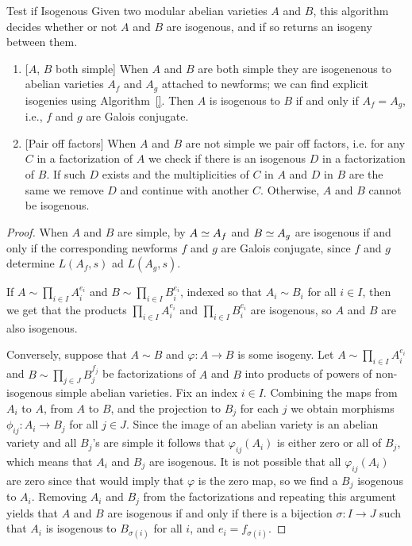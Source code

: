 \documentclass{article}
\begin{document}
\begin{algorithm}{Test if Isogenous}
    Given two modular abelian varieties $A$ and $B$, this
    algorithm decides whether or not $A$ and $B$ are isogenous, and if
    so returns an isogeny between them.

\begin{enumerate}
\item{} [$A$, $B$ both simple] When $A$ and $B$ are both simple they
  are isogenenous to abelian varieties $A_f$ and $A_g$ attached to
  newforms; we can find explicit isogenies using Algorithm~\ref{}.
  Then $A$ is isogenous to $B$ if and only if $A_f = A_g$, i.e., $f$
  and $g$ are Galois conjugate.


\item{} [Pair off factors] When $A$ and $B$ are not simple we pair off
  factors, i.e. for any $C$ in a factorization of $A$ we check if
  there is an isogenous $D$ in a factorization of $B$. If such $D$
  exists and the multiplicities of $C$ in $ A$ and $D$ in $B$ are the
  same we remove $D$ and continue with another $C$. Otherwise, $A$ and
  $B$ cannot be isogenous.
\end{enumerate}
\end{algorithm}
\begin{proof}
  When $A$ and $B$ are simple, by \cite[\S5]{faltings:finiteness}
  $A\simeq A_f$ and $B\simeq A_g$ are isogenous if and only if the
  corresponding newforms $f$ and $g$ are Galois conjugate,
since $f$ and $g$ determine $L(A_f,s)$ ad $L(A_g,s)$.

If $A \sim \prod_{i \in I} A_i^{e_i}$ and $B \sim \prod_{i \in I}
B_i^{e_i}$, indexed so that $A_i \sim B_i$ for all $i \in I$, then we
get that the products $\prod_{i \in I} A_i^{e_i}$ and $\prod_{i \in I}
B_i^{e_i}$ are isogenous, so $A$ and $B$ are also isogenous.

  Conversely, suppose that $A \sim B$ and $\varphi: A \to B$ is some
  isogeny.  Let $A \sim \prod_{i \in I} A_i^{e_i}$ and $B \sim
  \prod_{j \in J} B_j^{f_j}$ be factorizations of $A$ and $B$ into
  products of powers of non-isogenous simple abelian varieties. Fix an
  index $i \in I$.  Combining the maps from $A_i$ to $A$, from $A$ to
  $B$, and the projection to $B_j$ for each $j$ we obtain morphisms
  $\phi_{ij}: A_i \to B_j$ for all $j \in J$. Since the image of an
  abelian variety is an abelian variety and all $B_j$'s are simple it
  follows that $\varphi_{ij}(A_i)$ is either zero or all of $B_j$,
  which means that $A_i$ and $B_j$ are isogenous. It is not possible
  that all $\varphi_{ij}(A_i)$ are zero since that would imply that
  $\varphi$ is the zero map, so we find a $B_j$ isogenous to
  $A_i$. Removing $A_i$ and $B_j$ from the factorizations and
  repeating this argument yields that $A$ and $B$ are isogenous if and
  only if there is a bijection $\sigma:I\to J$ such that $A_i$ is
  isogenous to $B_{\sigma(i)}$ for all $i$, and $e_i = f_{\sigma(i)}$.
\end{proof}
\end{document}
